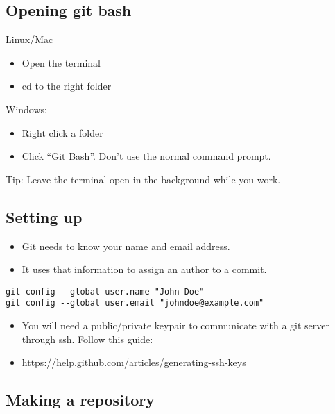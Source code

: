 \documentclass[10pt,a4paper]{beamer}
\begin{document}
\subsection{Opening git bash}
\begin{frame}
Linux/Mac
\begin{itemize}
\item Open the terminal
\item cd to the right folder
\end{itemize}

Windows:
\begin{itemize}
\item Right click a folder
\item Click ``Git Bash''. Don't use the normal command prompt.
\end{itemize}

Tip: Leave the terminal open in the background while you work.


\end{frame}

\subsection{Setting up}
\begin{frame}[fragile]
\begin{itemize}
\item Git needs to know your name and email address.
\item It uses that information to assign an author to a commit.
\end{itemize}

\begin{lstlisting}[frame=single]
git config --global user.name "John Doe"
git config --global user.email "johndoe@example.com"
\end{lstlisting}

\begin{itemize}
\item You will need a public/private keypair to communicate with a git server through ssh. Follow this guide:
\item \url{https://help.github.com/articles/generating-ssh-keys}
\end{itemize}
\end{frame}

\subsection{Making a repository}
\begin{frame}

\end{frame}
\end{document}
